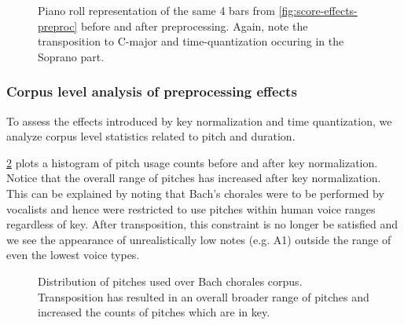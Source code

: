 \begin{figure}[p]
    \centering
        
        
    \caption{Piano roll representation of the same 4 bars from \cref{fig:score-effects-preproc}
      before and after preprocessing. Again, note the transposition to C-major
      and time-quantization occuring in the Soprano part.}
    \label{fig:piano-roll-effects-preproc}
\end{figure}

\subsubsection{Corpus level analysis of preprocessing effects}

To assess the effects introduced by key normalization and time quantization,
we analyze corpus level statistics related to pitch and duration.

\cref{fig:pitch-key-standardization} plots a histogram of pitch usage counts
before and after key normalization. Notice that the overall range of pitches
has increased after key normalization. This can be explained by noting that
Bach's chorales were to be performed by vocalists and hence were restricted to
use pitches within human voice ranges regardless of key. After transposition,
this constraint is no longer be satisfied and we see the appearance of
unrealistically low notes (e.g. A1) outside the range of even the lowest voice
types.

\begin{landscape}
  \begin{figure}[p]
    \centering
    \begin{subfigure}[c]{0.7\textwidth}
        \centering
        
        
    \end{subfigure}
    \begin{subfigure}[c]{0.28\textwidth}
        \centering
        
        
    \end{subfigure}
    \caption{Distribution of pitches used over Bach chorales corpus.
      Transposition has resulted in an overall broader range of pitches and
    increased the counts of pitches which are in key.}
    \label{fig:pitch-key-standardization}
  \end{figure}
\end{landscape}

